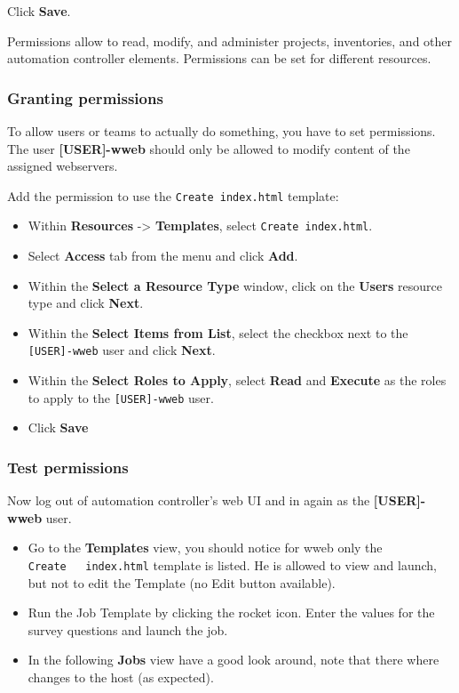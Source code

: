 Click \textbf{Save}.

Permissions allow to read, modify, and administer projects, inventories,
and other automation controller elements. Permissions can be set for
different resources.

\hypertarget{granting-permissions}{%
\subsubsection{Granting permissions}\label{granting-permissions}}

To allow users or teams to actually do something, you have to set
permissions. The user \textbf{[USER]-wweb} should only be allowed to modify
content of the assigned webservers.

Add the permission to use the \texttt{Create\ index.html} template:

\begin{itemize}
\item
  Within \textbf{Resources} -\textgreater{} \textbf{Templates}, select
  \texttt{Create\ index.html}.
\item
  Select \textbf{Access} tab from the menu and click \textbf{Add}.
\item
  Within the \textbf{Select a Resource Type} window, click on the
  \textbf{Users} resource type and click \textbf{Next}.
\item
  Within the \textbf{Select Items from List}, select the checkbox next
  to the \texttt{[USER]-wweb} user and click \textbf{Next}.
\item
  Within the \textbf{Select Roles to Apply}, select \textbf{Read} and
  \textbf{Execute} as the roles to apply to the \texttt{[USER]-wweb} user.
\item
  Click \textbf{Save}
\end{itemize}

\hypertarget{test-permissions}{%
\subsubsection{Test permissions}\label{test-permissions}}

Now log out of automation controller's web UI and in again as the
\textbf{[USER]-wweb} user.

\begin{itemize}
\item
  Go to the \textbf{Templates} view, you should notice for wweb only the
  \texttt{Create\ \ \ index.html} template is listed. He is allowed to
  view and launch, but not to edit the Template (no Edit button
  available).
\item
  Run the Job Template by clicking the rocket icon. Enter the values for
  the survey questions and launch the job.
\item
  In the following \textbf{Jobs} view have a good look around, note that
  there where changes to the host (as expected).
\end{itemize}

